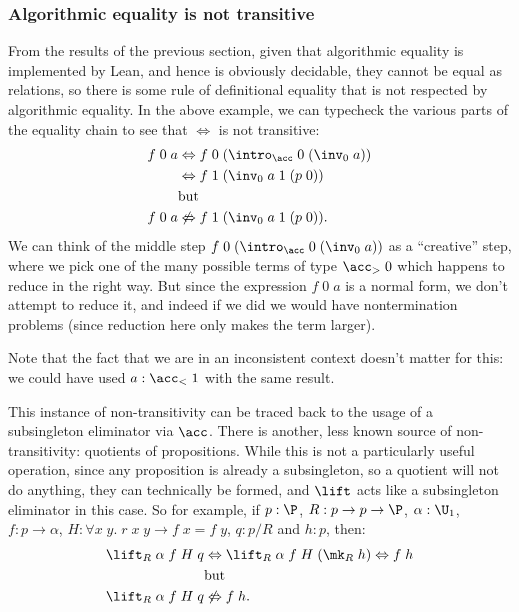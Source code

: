 \subsubsection{Algorithmic equality is not transitive}
From the results of the previous section, given that algorithmic equality is implemented by Lean, and hence is obviously decidable, they cannot be equal as relations, so there is some rule of definitional equality that is not respected by algorithmic equality. In the above example, we can typecheck the various parts of the equality chain to see that $\Leftrightarrow$ is not transitive:
\begin{align*}
f\;0\;a&\Leftrightarrow f\;0\;(\intro_\acc\;0\;(\inv_0\;a))\\
&\Leftrightarrow f\;1\;(\inv_0\;a\;1\;(p\;0))\\
&\mbox{but}\\
f\;0\;a&\not\Leftrightarrow f\;1\;(\inv_0\;a\;1\;(p\;0)).
\end{align*}
We can think of the middle step $f\;0\;(\intro_\acc\;0\;(\inv_0\;a))$ as a ``creative'' step, where we pick one of the many possible terms of type $\acc_{>}\;0$ which happens to reduce in the right way. But since the expression $f\;0\;a$ is a normal form, we don't attempt to reduce it, and indeed if we did we would have nontermination problems (since reduction here only makes the term larger).

Note that the fact that we are in an inconsistent context doesn't matter for this: we could have used $a:\acc_{<}\;1$ with the same result.

This instance of non-transitivity can be traced back to the usage of a subsingleton eliminator via $\acc$. There is another, less known source of non-transitivity: quotients of propositions. While this is not a particularly useful operation, since any proposition is already a subsingleton, so a quotient will not do anything, they can technically be formed, and $\lift$ acts like a subsingleton eliminator in this case. So for example, if $p:\P$, $R:p\to p\to\P$, $\alpha:\U_1$, $f:p\to\alpha$, $H:\forall x\;y.\;r\;x\;y\to f\;x= f\;y$, $q:p/R$ and $h:p$, then:
\begin{align*}
\lift_R\;\alpha\;f\;H\;q&\Leftrightarrow \lift_R\;\alpha\;f\;H\;(\mk_R\;h)\Leftrightarrow f\;h\\
&\mbox{but}\\
\lift_R\;\alpha\;f\;H\;q&\not\Leftrightarrow f\;h.
\end{align*}

